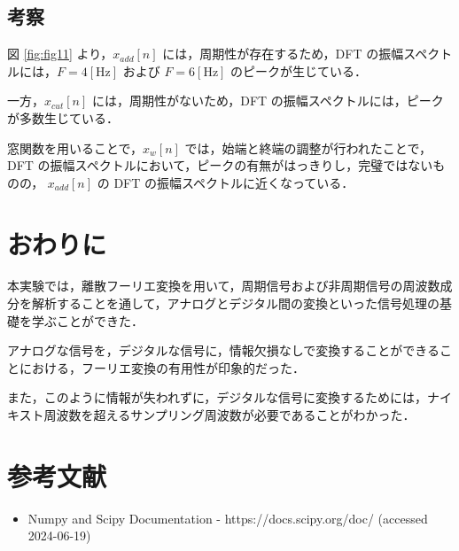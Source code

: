 \documentclass[fleqn, a4paper. 12pt]{jsarticle}
\begin{document}
    \subsection*{考察}
  
      図 \ref{fig:fig11} より，$x_{add}[n]$ には，周期性が存在するため，DFT の振幅スペクトルには，$F = 4 [\mathrm{Hz}]$ および $F = 6 [\mathrm{Hz}]$ のピークが生じている．

      一方，$x_{cut}[n]$ には，周期性がないため，DFT の振幅スペクトルには，ピークが多数生じている．

      窓関数を用いることで，$x_w[n]$ では，始端と終端の調整が行われたことで，DFT の振幅スペクトルにおいて，ピークの有無がはっきりし，完璧ではないものの， $x_{add}[n]$ の DFT の振幅スペクトルに近くなっている．

  \newpage

  \section*{おわりに}

    本実験では，離散フーリエ変換を用いて，周期信号および非周期信号の周波数成分を解析することを通して，アナログとデジタル間の変換といった信号処理の基礎を学ぶことができた．

    アナログな信号を，デジタルな信号に，情報欠損なしで変換することができることにおける，フーリエ変換の有用性が印象的だった．

    また，このように情報が失われずに，デジタルな信号に変換するためには，ナイキスト周波数を超えるサンプリング周波数が必要であることがわかった．

  \newpage
  
  \section*{参考文献}

    \begin{itemize}
        \item Numpy and Scipy Documentation - https://docs.scipy.org/doc/ (accessed 2024-06-19)
    \end{itemize}
\end{document}
